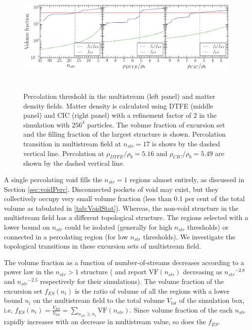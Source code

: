 \documentclass[fleqn,usenatbib,useAMS]{mnras}
\begin{document}
\begin{figure}
\begin{minipage}[t]{.99\linewidth}
  \centering\includegraphics[height=5.7cm]{fig5.pdf} 
\end{minipage}\hfill
\caption{Percolation threshold in the multistream (left panel) and matter density fields. Matter density is calculated using DTFE (middle panel) and CIC (right panel) with a refinement factor of 2 in the simulation with $256^3$ particles. The volume fraction of excursion set and the filling fraction of the largest structure is shown. Percolation transition in multistream field at $n_{str} = 17$ is shows by the dashed vertical line. Percolation at $\rho_{DTFE}/ \rho_b = 5.16 $ and $\rho_{CIC}/ \rho_b = 5.49 $ are shown by the dashed vertical line. }
\label{fig:HaloFil}
\end{figure}

A single percolating void fills the $n_{str} = 1$ regions almost entirely, as discussed in Section \ref{sec:voidPerc}. Disconnected pockets of void may exist, but they collectively occupy very small volume fraction (less than 0.1 per cent of the total volume as tabulated in \autoref{tab:VoidStat}). Whereas, the non-void structure in the multistream field has a different topological structure. The regions selected with a lower bound on $n_{str}$ could be isolated (generally for high $n_{str}$ thresholds) or connected in a percolating region (for low $n_{str}$ thresholds). We investigate the topological transitions in these excursion sets of multistream field. 



The volume fraction as a function of number-of-streams decreases according to a power law in the $n_{str} > 1$ structure (\citealt{Shandarin2012} and \citealt{Ramachandra2015} report $\text{VF}(n_{str})$ decreasing as ${n_{str}}^{-2.8} $ and  ${n_{str}}^{-2.5}$ respectively for their simulations). The volume fraction of the excursion set $f_{ES}(n_i)$ is the ratio of volume of all the regions with a lower bound $n_i$ on the multistream field to the total volume $V_{tot}$ of the simulation box, i.e, $ \displaystyle f_{ES}(n_i) = \frac{V_{ES}}{V_{tot}} =  {\sum\limits_{n_{str} \geq n_i} \text{VF} ({n_{str}})}$. Since volume fraction of the each $n_{str}$ rapidly increases with an decrease in multistream value, so does the $f_{ES}$. 
\end{document}
